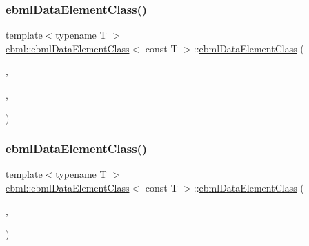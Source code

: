\mbox{\label{classebml_1_1ebmlDataElementClass_3_01const_01T_01_4_a6520906c14ba70894272b26833de66c9}} 
\subsubsection{\texorpdfstring{ebml\+Data\+Element\+Class()}{ebmlDataElementClass()}\hspace{0.1cm}{\footnotesize\ttfamily [3/6]}}
{\footnotesize\ttfamily template$<$typename T $>$ \\
\mbox{\hyperlink{classebml_1_1ebmlDataElementClass}{ebml\+::ebml\+Data\+Element\+Class}}$<$ const T $>$\+::\mbox{\hyperlink{classebml_1_1ebmlDataElementClass}{ebml\+Data\+Element\+Class}} (\begin{DoxyParamCaption}\item[{const char $\ast$}]{,  }\item[{const std\+::wstring \&}]{,  }\item[{T \&\&}]{ }\end{DoxyParamCaption})}

\mbox{\label{classebml_1_1ebmlDataElementClass_3_01const_01T_01_4_a83d68654ada83eb978d50133b93df485}} 
\subsubsection{\texorpdfstring{ebml\+Data\+Element\+Class()}{ebmlDataElementClass()}\hspace{0.1cm}{\footnotesize\ttfamily [4/6]}}
{\footnotesize\ttfamily template$<$typename T $>$ \\
\mbox{\hyperlink{classebml_1_1ebmlDataElementClass}{ebml\+::ebml\+Data\+Element\+Class}}$<$ const T $>$\+::\mbox{\hyperlink{classebml_1_1ebmlDataElementClass}{ebml\+Data\+Element\+Class}} (\begin{DoxyParamCaption}\item[{\mbox{\hyperlink{namespaceebml_a86c5f604ddf12a74aa9812e997a58691}{ebml\+I\+D\+\_\+t}}}]{,  }\item[{const std\+::wstring \&}]{ }\end{DoxyParamCaption})}

